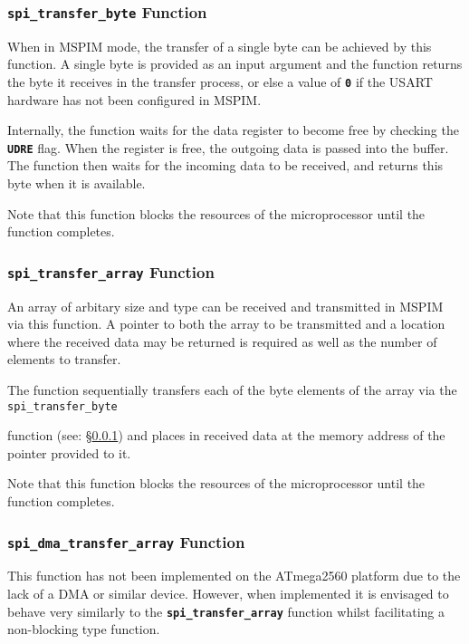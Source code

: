 \documentclass[a4paper, oneside, 11pt, titlepage, onecolumn, openright]{report}
\begin{document}
{{\subsubsection{\textbf{\texttt{spi\_transfer\_byte}} Function}
			\label{sss:HALusartMasterSPIModespi_transfer_byteFunctions}
			
			When in MSPIM mode, the transfer of a single byte can be achieved by this function. A single byte is provided as an input argument and the function returns the byte it receives in the transfer process, or else a value of \textbf{\texttt{0}} if the USART hardware has not been configured in MSPIM.
			
			Internally, the function waits for the data register to become free by checking the \textbf{\texttt{UDRE}} flag. When the register is free, the outgoing data is passed into the buffer. The function then waits for the incoming data to be received, and returns this byte when it is available.
			
			Note that this function blocks the resources of the microprocessor until the function completes.
			
\subsubsection{\textbf{\texttt{spi\_transfer\_array}} Function}
			\label{sss:HALusartMasterSPIModespi_transfer_arrayFunctions}
			
			An array of arbitary size and type can be received and transmitted in MSPIM via this function. A pointer to both the array to be transmitted and a location where the received data may be returned is required as well as the number of elements to transfer.
			
			The function sequentially transfers each of the byte elements of the array via the \texttt{spi\_transfer\_byte}} function (see: \S \ref{sss:HALusartMasterSPIModespi_transfer_byteFunctions}) and places in received data at the memory address of the pointer provided to it.
			
			Note that this function blocks the resources of the microprocessor until the function completes.
			
\subsubsection{\textbf{\texttt{spi\_dma\_transfer\_array}} Function}
			\label{sss:HALusartMasterSPIModespi_dma_transfer_arrayFunctions}
			
			This function has not been implemented on the ATmega2560 platform due to the lack of a DMA or similar device. However, when implemented it is envisaged to behave very similarly to the \textbf{\texttt{spi\_transfer\_array}} function whilst facilitating a non-blocking type function.
			
}
\end{document}
